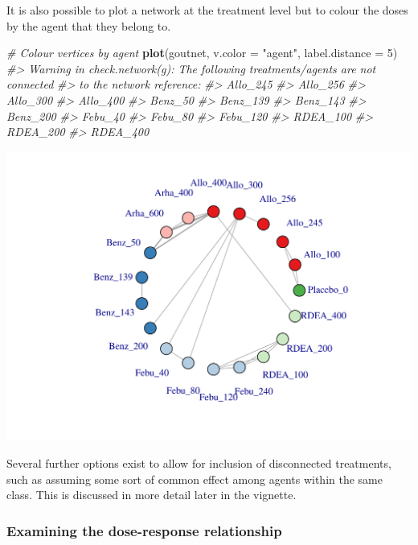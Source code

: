 \documentclass[]{article}
\newenvironment{Shaded}{\begin{snugshade}}{\end{snugshade}}
\newcommand{\CommentTok}[1]{\textcolor[rgb]{0.56,0.35,0.01}{\textit{#1}}}
\newcommand{\DataTypeTok}[1]{\textcolor[rgb]{0.13,0.29,0.53}{#1}}
\newcommand{\DecValTok}[1]{\textcolor[rgb]{0.00,0.00,0.81}{#1}}
\newcommand{\KeywordTok}[1]{\textcolor[rgb]{0.13,0.29,0.53}{\textbf{#1}}}
\newcommand{\NormalTok}[1]{#1}
\newcommand{\StringTok}[1]{\textcolor[rgb]{0.31,0.60,0.02}{#1}}
\begin{document}
It is also possible to plot a network at the treatment level but to
colour the doses by the agent that they belong to.

\begin{Shaded}
\begin{Highlighting}[]
\CommentTok{# Colour vertices by agent}
\KeywordTok{plot}\NormalTok{(goutnet, }\DataTypeTok{v.color =} \StringTok{"agent"}\NormalTok{, }\DataTypeTok{label.distance =} \DecValTok{5}\NormalTok{)}
\CommentTok{#> Warning in check.network(g): The following treatments/agents are not connected}
\CommentTok{#> to the network reference:}
\CommentTok{#> Allo_245}
\CommentTok{#> Allo_256}
\CommentTok{#> Allo_300}
\CommentTok{#> Allo_400}
\CommentTok{#> Benz_50}
\CommentTok{#> Benz_139}
\CommentTok{#> Benz_143}
\CommentTok{#> Benz_200}
\CommentTok{#> Febu_40}
\CommentTok{#> Febu_80}
\CommentTok{#> Febu_120}
\CommentTok{#> RDEA_100}
\CommentTok{#> RDEA_200}
\CommentTok{#> RDEA_400}
\end{Highlighting}
\end{Shaded}

\includegraphics{mbnmadose_files/figure-latex/unnamed-chunk-11-1.pdf}

Several further options exist to allow for inclusion of disconnected
treatments, such as assuming some sort of common effect among agents
within the same class. This is discussed in more detail later in the
vignette.

\hypertarget{examining-the-dose-response-relationship}{%
\subsubsection{Examining the dose-response
relationship}\label{examining-the-dose-response-relationship}}
\end{document}
